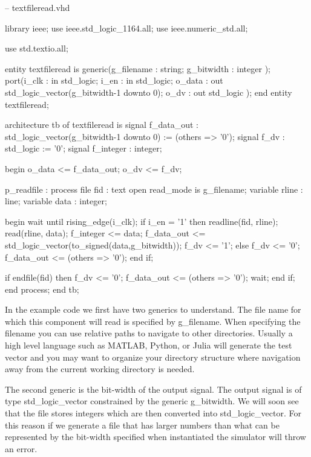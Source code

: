 \begin{VHDLlisting}[tabsize=4]
-- textfileread.vhd

library	ieee;
    use ieee.std_logic_1164.all;
    use ieee.numeric_std.all;
    
    use std.textio.all;
	
entity textfileread is 
    generic(g_filename : string;
            g_bitwidth : integer
    );
    port(i_clk    : in    std_logic;
         i_en     : in    std_logic;
         o_data   :   out std_logic_vector(g_bitwidth-1 downto 0);
         o_dv     :   out std_logic	
    );
end entity textfileread;

architecture tb of textfileread is
    signal f_data_out : std_logic_vector(g_bitwidth-1 downto 0) := (others => '0');
    signal f_dv       : std_logic := '0';
    signal f_integer  : integer;
	
begin
    o_data <= f_data_out;
    o_dv <= f_dv;
    
    p_readfile : process
        file fid       : text open read_mode is g_filename;		
        variable rline : line;
        variable data  : integer;
    	
    begin
        wait until rising_edge(i_clk);
        if i_en = '1' then
            readline(fid, rline);
            read(rline, data);
            f_integer <= data;
            f_data_out <= std_logic_vector(to_signed(data,g_bitwidth));
            f_dv <= '1';			
        else
            f_dv <= '0';
            f_data_out <= (others => '0');
        end if;
        
        if endfile(fid) then
            f_dv <= '0';
            f_data_out <= (others => '0');
            wait;
        end if;		
    end process;
end tb;
\end{VHDLlisting}

In the example code we first have two generics to understand. The file name for which this component will read is specified by g\_filename. When specifying the filename you can use relative paths to navigate to other directories. Usually a high level language such as MATLAB, Python, or Julia will generate the test vector and you may want to organize your directory structure where navigation away from the current working directory is needed. 

The second generic is the bit-width of the output signal. The output signal is of type std\_logic\_vector constrained by the generic g\_bitwidth. We will soon see that the file stores integers which are then converted into std\_logic\_vector. For this reason if we generate a file that has larger numbers than what can be represented by the bit-width specified when instantiated the simulator will throw an error.


